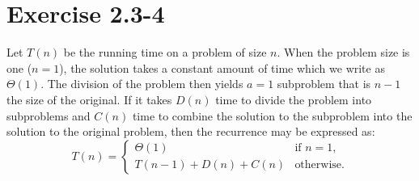 \documentclass{article}
\begin{document}
\section*{Exercise 2.3-4}

Let $T(n)$ be the running time on a problem of size $n$. When the problem size is one ($n = 1$), the solution takes a constant amount of time which we write as $\Theta(1)$. The division of the problem then yields $a = 1$ subproblem that is $n - 1$ the size of the original. If it takes $D(n)$ time to divide the problem into subproblems and $C(n)$ time to combine the solution to the subproblem into the solution to the original problem, then the recurrence may be expressed as:
\begin{equation*}
	T(n) = \left\{
	       \begin{array}{ll}
		\Theta(1) & \text{if } n = 1, \\
		T(n - 1) + D(n) + C(n) & \text{otherwise}.
	\end{array} \right.
\end{equation*}
\end{document}
